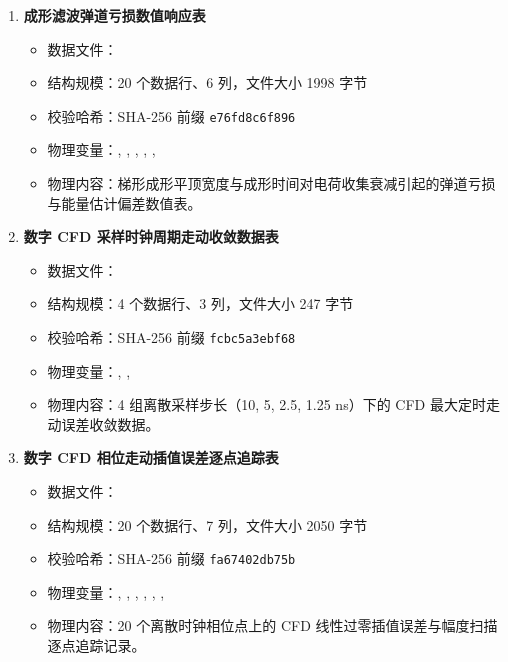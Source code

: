 \begin{enumerate}[label=(\arabic*),leftmargin=2em]
    \item \textbf{成形滤波弹道亏损数值响应表}
    \begin{itemize}[nosep]
        \item 数据文件：
        \item 结构规模：20 个数据行、6 列，文件大小 1998 字节
        \item 校验哈希：SHA-256 前缀 \texttt{e76fd8c6f896}
        \item 物理变量：, , , , , 
        \item 物理内容：梯形成形平顶宽度与成形时间对电荷收集衰减引起的弹道亏损与能量估计偏差数值表。
    \end{itemize}
    \vspace{1ex}
    \item \textbf{数字 CFD 采样时钟周期走动收敛数据表}
    \begin{itemize}[nosep]
        \item 数据文件：
        \item 结构规模：4 个数据行、3 列，文件大小 247 字节
        \item 校验哈希：SHA-256 前缀 \texttt{fcbc5a3ebf68}
        \item 物理变量：, , 
        \item 物理内容：4 组离散采样步长（10, 5, 2.5, 1.25 ns）下的 CFD 最大定时走动误差收敛数据。
    \end{itemize}
    \vspace{1ex}
    \item \textbf{数字 CFD 相位走动插值误差逐点追踪表}
    \begin{itemize}[nosep]
        \item 数据文件：
        \item 结构规模：20 个数据行、7 列，文件大小 2050 字节
        \item 校验哈希：SHA-256 前缀 \texttt{fa67402db75b}
        \item 物理变量：, , , , , , 
        \item 物理内容：20 个离散时钟相位点上的 CFD 线性过零插值误差与幅度扫描逐点追踪记录。
    \end{itemize}
\end{enumerate}

